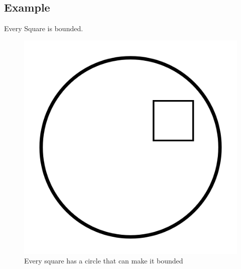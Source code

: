 \documentclass{article}
\begin{document}
\subsection*{Example}
Every Square is bounded.
\begin{figure}[h!]
    \centering
    \includegraphics[scale =.15]{squareInCircle.png}
    \caption{Every square has a circle that can make it bounded}
    \label{}
\end{figure}
\end{document}

